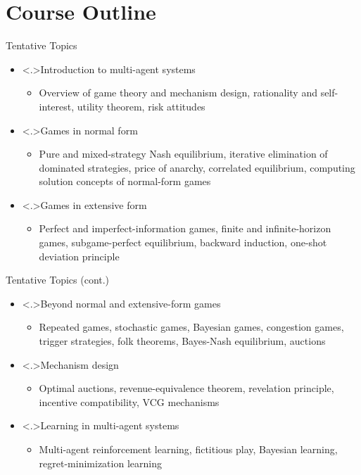 \documentclass[11pt,aspectratio=169,handout]{beamer}
\begin{document}
 \section{Course Outline}
  \begin{frame}{Tentative Topics}
   \begin{itemize}[<+->]
    \setlength{\itemsep}{1em}
    \item\alert<.>{Introduction to multi-agent systems}
    \begin{itemize}[<.->]
     \item Overview of game theory and mechanism design, rationality and self-interest, utility theorem, risk attitudes
    \end{itemize}
    \item\alert<.>{Games in normal form}
    \begin{itemize}[<.->]
     \item Pure and mixed-strategy Nash equilibrium, iterative elimination of dominated strategies, price of anarchy, correlated equilibrium, computing solution concepts of normal-form games
    \end{itemize}
    \item\alert<.>{Games in extensive form}
    \begin{itemize}[<.->]
     \item Perfect and imperfect-information games, finite and infinite-horizon games, subgame-perfect equilibrium, backward induction, one-shot deviation principle
    \end{itemize}
   \end{itemize}
  \end{frame}
 
  \begin{frame}{Tentative Topics (cont.)}
   \begin{itemize}[<+->]
    \setlength{\itemsep}{1em}
    \item\alert<.>{Beyond normal and extensive-form games}
    \begin{itemize}[<.->]
     \item Repeated games, stochastic games, Bayesian games, congestion games, trigger strategies, folk theorems, Bayes-Nash equilibrium, auctions
    \end{itemize}
    \item\alert<.>{Mechanism design}
    \begin{itemize}[<.->]
     \item Optimal auctions, revenue-equivalence theorem, revelation principle, incentive compatibility, VCG mechanisms
    \end{itemize}
    \item\alert<.>{Learning in multi-agent systems}
    \begin{itemize}[<.->]
     \item Multi-agent reinforcement learning, fictitious play, Bayesian learning, regret-minimization learning
    \end{itemize}
   \end{itemize}
  \end{frame}
 
\end{document}
